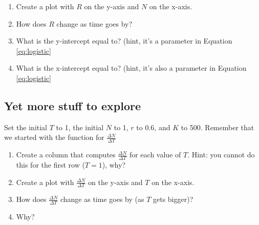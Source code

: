 \documentclass[]{book}
\providecommand{\tightlist}{%
  \setlength{\itemsep}{0pt}\setlength{\parskip}{0pt}}
\begin{document}
\begin{enumerate}
\def\labelenumi{\arabic{enumi}.}
\setcounter{enumi}{4}
\tightlist
\item
  Create a plot with \(R\) on the y-axis and \(N\) on the x-axis.
\item
  How does \(R\) change as time goes by?
\item
  What is the y-intercept equal to? (hint, it's a parameter in Equation
  \eqref{eq:logistic}
\item
  What is the x-intercept equal to? (hint, it's also a parameter in
  Equation \eqref{eq:logistic}
\end{enumerate}

\subsection{Yet more stuff to explore}\label{yet-more-stuff-to-explore}

Set the initial \(T\) to 1, the initial \(N\) to 1, \(r\) to 0.6, and
\(K\) to 500. Remember that we started with the function for
\(\frac{\Delta N}{\Delta T}\)

\begin{enumerate}
\def\labelenumi{\arabic{enumi}.}
\setcounter{enumi}{8}
\tightlist
\item
  Create a column that computes \(\frac{\Delta N}{\Delta T}\) for each
  value of \(T\). Hint: you cannot do this for the first row (\(T=1\)),
  why?
\item
  Create a plot with \(\frac{\Delta N}{\Delta T}\) on the y-axis and
  \(T\) on the x-axis.
\item
  How does \(\frac{\Delta N}{\Delta T}\) change as time goes by (as
  \(T\) gets bigger)?
\item
  Why?
\end{enumerate}


\end{document}
